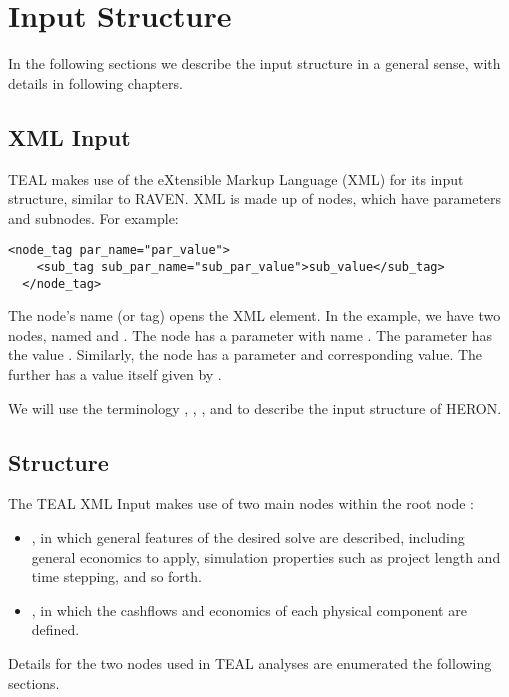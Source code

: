 \section{Input Structure}
In the following sections we describe the input structure in a general sense, with details in
following chapters.

\subsection{XML Input}
TEAL makes use of the eXtensible Markup Language (XML) for its input structure, similar to RAVEN.
XML is made up of nodes, which have parameters and subnodes. For example:
\begin{lstlisting}[style=XML,morekeywords={class}]
  <node_tag par_name="par_value">
    <sub_tag sub_par_name="sub_par_value">sub_value</sub_tag>
  </node_tag>
\end{lstlisting}
The node's name (or tag) opens the XML element. In the example, we have two nodes, named
 and . The node  has a parameter with
name . The parameter  has the value
. Similarly, the  node has a parameter and
corresponding value. The  further has a value itself given by
.

We will use the terminology , , , and
 to describe the input structure of HERON.

\subsection{Structure}
The TEAL XML Input makes use of two main nodes within the root node :
\begin{itemize}
  \item {}, in which general features of the desired solve are described, including general
    economics to apply, simulation properties such as project length and time stepping, and so forth.
  \item {}, in which the cashflows and economics of each physical component are defined.
\end{itemize}

Details for the two nodes used in TEAL analyses are enumerated the following sections.